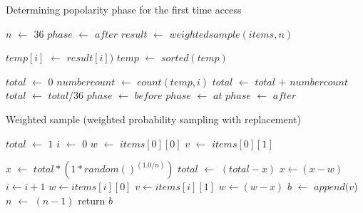 \documentclass[10pt,final,journal,a4paper]{IEEEtran}
\begin{document}
\begin{algorithm}
\caption{Determining popolarity phase for the first time access}
\label{alg4}
\begin{algorithmic}[1]

\STATE $n$ $\leftarrow$ $36$ 
\STATE $phase$ $\leftarrow$ $after$
\ELSE
\STATE $result$ $\leftarrow$ $weightedsample(items,n)$
\ENDIF

\STATE $temp[i]$ $\leftarrow$ $result[i])$ 
\ENDFOR
\STATE $temp$ $\leftarrow$ $sorted(temp)$  

\STATE $total$ $\leftarrow$ $0$
\STATE $numbercount$ $\leftarrow$ $count(temp,i)$ 
\STATE $total$ $\leftarrow$ $total$ $+$ $numbercount$ 
\ENDFOR
\STATE $total$ $\leftarrow$ $total/36$ 
\STATE $phase$ $\leftarrow$ $before$
\STATE $phase$ $\leftarrow$ $at$ 
\ELSE
\STATE $phase$ $\leftarrow$ $after$ 
\ENDIF

\end{algorithmic}
\end{algorithm}

\begin{algorithm}
\caption{Weighted sample (weighted probability sampling with replacement)}
\label{alg5}
\begin{algorithmic}[1]

\STATE $total$  $\leftarrow$ $1$
\STATE $i$ $\leftarrow$ $0$ 
\STATE $w$ $\leftarrow$ $items[0][0]$ 
\STATE $v$ $\leftarrow$ $items[0][1]$ 

\STATE $x$ $\leftarrow$ $total * (1*random() ^ {(1.0/n)})$
\STATE $total$ $\leftarrow$ $(total - x)$
\STATE $x \leftarrow (x-w)$
\STATE $i \leftarrow i+1$
\STATE $w \leftarrow items[i][0]$
\STATE $v \leftarrow items[i][1]$
\ENDWHILE
\STATE $w \leftarrow (w-x)$
\STATE $b$ $\leftarrow$ $append(v$) 
\STATE $n$ $\leftarrow$ $(n-1)$
\STATE return $b$
\ENDWHILE

\end{algorithmic}
\end{algorithm}
\end{document}
